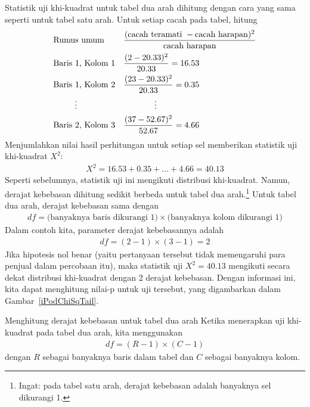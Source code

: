 Statistik uji khi-kuadrat untuk tabel dua arah dihitung
dengan cara yang sama seperti untuk tabel satu arah.
Untuk setiap cacah pada tabel, hitung
\begin{align*}
&\text{Rumus umum} &&
    \frac{(\text{cacah teramati } - \text{cacah harapan})^2}
        {\text{cacah harapan}} \\
&\text{Baris 1, Kolom 1} &&
    \frac{(\iPodAA - \iPodAExpected)^2}{\iPodAExpected} = 16.53 \\
&\text{Baris 1, Kolom 2} &&
    \frac{(\iPodAB - \iPodAExpected)^2}{\iPodAExpected} = 0.35 \\
& \hspace{9mm}\vdots &&
    \hspace{13mm}\vdots \\
&\text{Baris 2, Kolom 3} &&
    \frac{(\iPodBC - \iPodBExpected)^2}{\iPodBExpected} = 4.66
\end{align*}
Menjumlahkan nilai hasil perhitungan untuk setiap sel memberikan statistik uji khi-kuadrat $X^2$:
\begin{align*}
X^2 = 16.53 + 0.35 + \dots + 4.66 = 40.13
\end{align*}
Seperti sebelumnya, statistik uji ini mengikuti distribusi khi-kuadrat. Namun, derajat kebebasan dihitung sedikit berbeda untuk tabel dua arah.\footnote{Ingat: pada tabel satu arah, derajat kebebasan adalah banyaknya sel dikurangi 1.} Untuk tabel dua arah, derajat kebebasan sama dengan
\begin{align*}
df = \text{(banyaknya baris dikurangi 1)}\times \text{(banyaknya kolom dikurangi 1)}
\end{align*}
Dalam contoh kita, parameter derajat kebebasannya adalah
\begin{align*}
df = (2-1)\times (3-1) = 2
\end{align*}
Jika hipotesis nol benar
(yaitu pertanyaan tersebut tidak memengaruhi para penjual dalam
    percobaan itu),
maka statistik uji $X^2 = 40.13$ mengikuti secara dekat
distribusi khi-kuadrat dengan 2 derajat kebebasan.
Dengan informasi ini, kita dapat menghitung nilai-p untuk
uji tersebut, yang digambarkan dalam
Gambar~\ref{iPodChiSqTail}.

\begin{onebox}{Menghitung derajat kebebasan untuk tabel dua arah}
  Ketika menerapkan uji khi-kuadrat pada tabel dua arah,
  kita menggunakan
  \begin{align*}
  df = (R-1)\times (C-1)
  \end{align*}
  dengan $R$ sebagai banyaknya baris dalam tabel
  dan $C$ sebagai banyaknya kolom.
\end{onebox}

